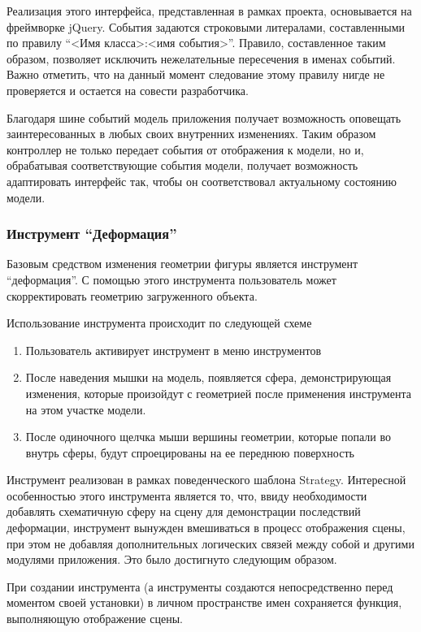 \documentclass[14pt, a4paper]{extarticle}
\begin{document}
Реализация этого интерфейса, представленная в рамках проекта, основывается на
фреймворке jQuery\cite{jquery}. События задаются строковыми литералами, составленными по правилу
``<Имя класса>:<имя события>''. Правило, составленное таким образом, позволяет
исключить нежелательные пересечения в именах событий. Важно отметить, что на
данный момент следование этому правилу нигде не проверяется и остается на
совести разработчика.

Благодаря шине событий модель приложения получает возможность оповещать
заинтересованных в любых своих внутренних изменениях. Таким образом контроллер
не только передает события от отображения к модели, но и, обрабатывая
соответствующие события модели, получает возможность адаптировать интерфейс так,
чтобы он соответствовал актуальному состоянию модели.

\subsubsection{Инструмент ``Деформация''}

Базовым средством изменения геометрии фигуры является инструмент ``деформация''.
С помощью этого инструмента пользователь может скорректировать геометрию
загруженного объекта.

Использование инструмента происходит по следующей схеме

\begin{enumerate}
    \item Пользователь активирует инструмент в меню инструментов
    \item После наведения мышки на модель, появляется сфера, демонстрирующая
    изменения, которые произойдут с геометрией после применения инструмента на
    этом участке модели.
    \item После одиночного щелчка мыши вершины геометрии, которые попали во
    внутрь сферы, будут спроецированы на ее переднюю поверхность
\end{enumerate}

Инструмент реализован в рамках поведенческого шаблона Strategy. Интересной
особенностью этого инструмента является то, что, ввиду необходимости добавлять
схематичную сферу на сцену для демонстрации последствий деформации, инструмент
вынужден вмешиваться в процесс отображения сцены, при этом не добавляя
дополнительных логических связей между собой и другими модулями приложения. Это
было достигнуто следующим образом.

При создании инструмента (а инструменты создаются непосредственно перед моментом
своей установки) в личном пространстве имен сохраняется функция,
выполняющую отображение сцены.
\end{document}
